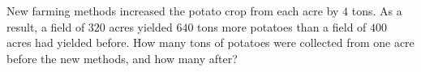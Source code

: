 New farming methods increased the potato crop from each acre by $4$ tons. As a result, a field of $320$ acres yielded $640$ tons more potatoes than a field of $400$ acres had yielded before. How many tons of potatoes were collected from one acre before the new methods, and how many after?
